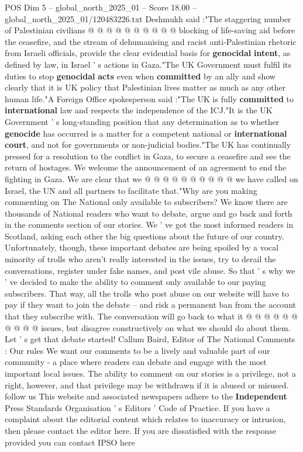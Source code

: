 \begin{textsample}{POS Dim 5 – global\_north\_2025\_01 – Score 18.00 – global\_north\_2025\_01/120483226.txt}
Deshmukh said :"The staggering number of Palestinian civilians @ @ @ @ @ @ @ @ @ @ blocking of life-saving aid before the ceasefire, and the stream of dehumanising and racist anti-Palestinian rhetoric from Israeli officials, provide the clear evidential basis for \textbf{genocidal} \textbf{intent}, as defined by law, in Israel ' s actions in Gaza."The UK Government must fulfil its duties to stop \textbf{genocidal} \textbf{acts} even when \textbf{committed} by an ally and show clearly that it is UK policy that Palestinian lives matter as much as any other human life."A Foreign Office spokesperson said :"The UK is fully \textbf{committed} to \textbf{international} law and respects the independence of the ICJ."It is the UK Government ' s long-standing position that any determination as to whether \textbf{genocide} has occurred is a matter for a competent national or \textbf{international} \textbf{court}, and not for governments or non-judicial bodies."The UK has continually pressed for a resolution to the conflict in Gaza, to secure a ceasefire and see the return of hostages.
We welcome the announcement of an agreement to end the fighting in Gaza.
We are clear that we @ @ @ @ @ @ @ @ @ @ we have called on Israel, the UN and all partners to facilitate that."Why are you making commenting on The National only available to subscribers?
We know there are thousands of National readers who want to debate, argue and go back and forth in the comments section of our stories.
We ' ve got the most informed readers in Scotland, asking each other the big questions about the future of our country.
Unfortunately, though, these important debates are being spoiled by a vocal minority of trolls who aren't really interested in the issues, try to derail the conversations, register under fake names, and post vile abuse.
So that ' s why we ' ve decided to make the ability to comment only available to our paying subscribers.
That way, all the trolls who post abuse on our website will have to pay if they want to join the debate -- and risk a permanent ban from the account that they subscribe with.
The conversation will go back to what it @ @ @ @ @ @ @ @ @ @ issues, but disagree constructively on what we should do about them.
Let ' s get that debate started!
Callum Baird, Editor of The National Comments : Our rules We want our comments to be a lively and valuable part of our community - a place where readers can debate and engage with the most important local issues.
The ability to comment on our stories is a privilege, not a right, however, and that privilege may be withdrawn if it is abused or misused. follow us This website and associated newspapers adhere to the \textbf{Independent} Press Standards Organisation ' s Editors ' Code of Practice.
If you have a complaint about the editorial content which relates to inaccuracy or intrusion, then please contact the editor here.
If you are dissatisfied with the response provided you can contact IPSO here

\end{textsample}
